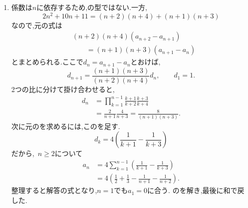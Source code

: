 \begin{enumerate}[label=\textbf{問\arabic*.},leftmargin=3.8em,format=\bookitemlink{practice-advanced}{solution}{problem}]
                \noindent \textbf{【別解】}\\
                $c_n$の式から$\displaystyle u_n=\frac{1}{c_n-1}$とおいてもよい.
                \[
                 u_{n+1}=\frac{n+2}{n}u_n+\frac1n.
                \]
                定数$\displaystyle \frac{1}{2}$を加えると,
                \[
                 u_{n+1}+\frac12
                   =\frac{n+2}{n}\left(u_n+\frac12\right).
                \]
                $\displaystyle u_1=\frac{1}{2}$から,\, $\displaystyle u_n+\frac{1}{2}=\frac{n(n+1)}{2}$を得る.二つの不動点との差の比を取る方法と,一つの不動点との差の逆数を取ってから定数を加える方法が,同じ答えを与える.
          \item 係数は$n$に依存するため,の型ではない.一方,
                \[
                  2n^2+10n+11
                   =(n+2)(n+4)+(n+1)(n+3)
                \]
                なので,元の式は
                \begin{align*}
                 &(n+2)(n+4)(a_{n+2}-a_{n+1})\\
                 &\qquad=(n+1)(n+3)(a_{n+1}-a_n)
                \end{align*}
                とまとめられる.ここで$d_n=a_{n+1}-a_n$とおけば,
                \[
                  d_{n+1}
                   =\frac{(n+1)(n+3)}{(n+2)(n+4)}d_n,
                  \qquad d_1=1.
                \]
                2つの比に分けて掛け合わせると,
                \begin{align*}
                 d_n
                  &=\prod_{k=1}^{n-1}
                      \frac{k+1}{k+2}\frac{k+3}{k+4}\\
                  &=\frac2{n+1}\frac4{n+3}
                   =\frac8{(n+1)(n+3)}.
                \end{align*}
                次に元のを求めるには,このを足す.
                \[
                 d_k=4\left(\frac1{k+1}-\frac1{k+3}\right)
                \]
                だから,\, $n\ge2$について
                \begin{align*}
                 a_n
                  &=4\sum_{k=1}^{n-1}
                       \left(\frac1{k+1}-\frac1{k+3}\right)\\
                  &=4\left(\frac12+\frac13
                          -\frac1{n+1}-\frac1{n+2}\right).
                \end{align*}
                整理すると解答の式となり,$n=1$でも$a_1=0$に合う.
                のを解き,最後に和で戻した.


\end{enumerate}
